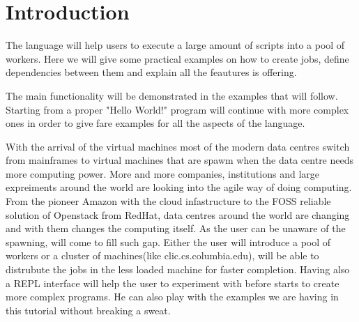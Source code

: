 \section{Introduction}
\label{sect:intro}
The \lang{} language will help users to execute a large amount of scripts into a pool of workers.
Here we will give some practical examples on how to create jobs, define dependencies between them and
explain all the feautures \lang{} is offering.


The main functionality will be demonstrated in the examples that will follow. Starting from a 
proper "Hello World!" program will continue with more complex ones in order to give fare examples
for all the aspects of the language.


With the arrival of the virtual machines most of the modern data centres switch from mainframes to
virtual machines that are spawm when the data centre needs more computing power. More and more companies,
institutions and large expreiments around the world are looking into the agile way of doing computing. From the
pioneer Amazon with the cloud infastructure to the FOSS reliable solution of Openstack from RedHat,
data centres around the world are changing and with them changes the computing itself.
As the user can be unaware of the spawning, \lang{} will come to fill such gap. Either the user will
introduce a pool of workers or a cluster of machines(like clic.cs.columbia.edu), \lang{} will be 
able to distrubute the jobs in the less loaded machine for faster completion. Having also a REPL
interface will help the user to experiment with \lang{} before starts to create more complex 
programs. He can also play with the examples we are having in this tutorial without breaking a sweat.
